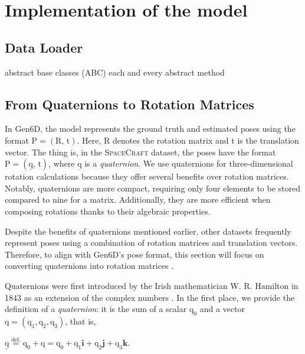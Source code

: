 
\chapter{Implementation of the model}\label{chapter:implementation_of_the_model}

\section{Data Loader}
abstract base classes (ABC)
each and every abstract method

\section{From Quaternions to Rotation Matrices}

In Gen6D, the model represents the ground truth and estimated poses using the format ${\bm{\mathrm{P}}}=(\bm{\mathrm{R}},\,\bm{\mathrm{t}})$. Here, $\bm{\mathrm{R}}$ denotes the rotation matrix and $\bm{\mathrm{t}}$ is the translation vector.
The thing is, in the \textsc{SpaceCraft} dataset, the poses have the format ${\bm{\mathrm{P}}}=(\underline{\bm{\mathrm{q}}},\,\bm{\mathrm{t}})$, where $\underline{\bm{\mathrm{q}}}$ is a \textit{quaternion}. We use quaternions for three-dimensional rotation calculations because they offer several benefits over rotation matrices. Notably, quaternions are more compact, requiring only four elements to be stored compared to nine for a matrix. Additionally, they are more efficient when composing rotations thanks to their algebraic properties.

Despite the benefits of quaternions mentioned earlier, other datasets frequently represent poses using a combination of rotation matrices and translation vectors. Therefore, to align with Gen6D's pose format, this section will focus on converting quaternions into rotation matrices \cite{jia2022quaternions}.

\bigbreak 

Quaternions were first introduced by the Irish mathematician W. R. Hamilton in 1843 as an extension of the complex numbers \cite{Hamilton1866}. In the first place, we provide the definition of a \textit{quaternion}: it is the sum of a scalar $\mathrm{q}_0$ and a vector $\bm{\mathrm{q}}=(\mathrm{q}_1, \mathrm{q}_2, \mathrm{q}_3)$, that is,
\begin{center}
	$\underline{\bm{\mathrm{q}}} \stackrel{\text{def.}}{=} \mathrm{q}_0 + \bm{\mathrm{q}} = \mathrm{q}_0 + \mathrm{q}_1\bm{i} + \mathrm{q}_2\bm{j} + \mathrm{q}_3\bm{k}$.
\end{center}


